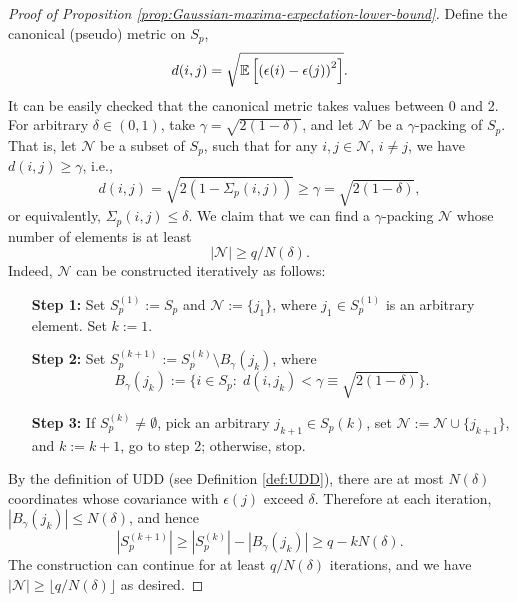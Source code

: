 \begin{proof}[Proof of Proposition \ref{prop:Gaussian-maxima-expectation-lower-bound}]
Define the canonical (pseudo) metric on $S_p$,
$$
d(i,j) = \sqrt{{\mathbb E}\left[\left(\epsilon(i)-\epsilon(j)\right)^2\right]}.
$$
It can be easily checked that the canonical metric takes values between 0 and 2.
For arbitrary $\delta\in(0,1)$, take $\gamma = \sqrt{2(1-\delta)}$, and
let $\mathcal{N}$ be a $\gamma$-packing of $S_p$. That is, let $\mathcal{N}$ be a subset of $S_p$, such that for any $i,j\in\mathcal{N}$, $i\neq j$, we have $d(i,j)\ge\gamma$, i.e.,
\begin{equation}\label{e:gamma-packing-def}
d(i,j) = \sqrt{2\left(1-\Sigma_p(i,j)\right)} \ge \gamma = \sqrt{2(1-\delta)},
\end{equation}
or equivalently, $\Sigma_p(i,j) \le \delta$.
We claim that we can find a $\gamma$-packing $\mathcal{N}$ whose number of elements is at least 
\begin{equation} \label{eq:packing-number-lower-bound}
    |\mathcal{N}| \ge q/N(\delta).
\end{equation}
Indeed, $\mathcal{N}$ can be constructed iteratively as follows:
\begin{itemize}[
    align=left,
    leftmargin=4em,
    itemindent=0pt,
    labelsep=0pt,
    labelwidth=4em
    ]
    \raggedright
    \item[{\bf Step 1:}] Set $S_p^{(1)}:=S_p$ and $\mathcal{N}:=\{j_1\}$, where $j_1\in S_p^{(1)}$ is an arbitrary element. Set $k:=1$.\\
    \item[{\bf Step 2:}] Set $S_p^{(k+1)}:=S_p^{(k)}\setminus B_\gamma(j_k)$, where
    $$
    B_\gamma(j_k) := \{i\in S_p: \;d(i,j_k) < \gamma \equiv \sqrt{2(1-\delta)}\}.
    $$
    \item[{\bf Step 3:}] If $S_p^{(k)} \neq \emptyset$, pick an arbitrary $j_{k+1}\in S_p{(k)}$, set $\mathcal{N}:=\mathcal{N}\cup\{j_{k+1}\}$, and $k:=k+1$, go to step 2; otherwise, stop.
\end{itemize}
By the definition of UDD (see Definition \ref{def:UDD}), there are at most $N(\delta)$ coordinates whose covariance with $\epsilon(j)$ exceed $\delta$. 
Therefore at each iteration, $\left|B_\gamma(j_k)\right|\le N(\delta)$, and hence
$$
\left|S_p^{(k+1)}\right| \ge \left|S_p^{(k)}\right| - \left| B_\gamma(j_k)\right| \ge q - kN(\delta).
$$
The construction can continue for at least $q/N(\delta)$ iterations, and we have $|\mathcal{N}| \ge \lfloor q/N(\delta) \rfloor$ as desired.
    

\end{proof}
